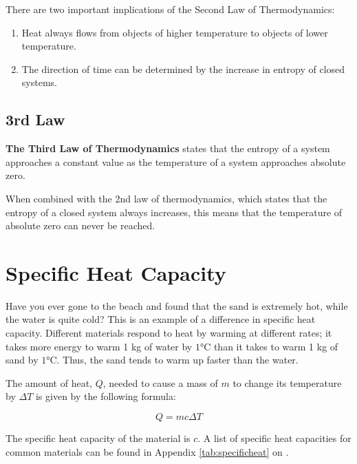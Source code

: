 			There are two important implications of the Second Law of Thermodynamics:
			\begin{enumerate}
				\item Heat always flows from objects of higher temperature to objects of lower temperature.  
				\item The direction of time can be determined by the increase in entropy of closed systems.  
			\end{enumerate}
			
			
			
	\subsection{3rd Law}
 \textbf{The Third Law of Thermodynamics} states that the entropy of a system approaches a constant value as the temperature of a system approaches absolute zero.  
 
 
 
 When combined with the 2nd law of thermodynamics, which states that the entropy of a closed system always increases, this means that the temperature of absolute zero can never be reached.  
	
	
	
	\section{Specific Heat Capacity}
	
	Have you ever gone to the beach and found that the sand is extremely hot, while the water is quite cold?  This is an example of a difference in specific heat capacity.  Different materials respond to heat by warming at different rates; it takes more energy to warm 1 kg of water by $1 \si{\degreeCelsius}$ than it takes to warm 1 kg of sand by $1 \si{\degreeCelsius}$.  Thus, the sand tends to warm up faster than the water.  
	
	The amount of heat, $Q$, needed to cause a mass of $m$ to change its temperature by $\Delta T$ is given by the following formula:
	
					\begin{mdframed}[backgroundcolor=orange!20!white]
		\begin{equation}
			Q = m c \Delta T 
			\label{eqn:specificheat}
		\end{equation}
	\end{mdframed}
	The specific heat capacity of the material is $c$.  A list of specific heat capacities for common materials can be found in Appendix \ref{tab:specificheat} on  .
	
